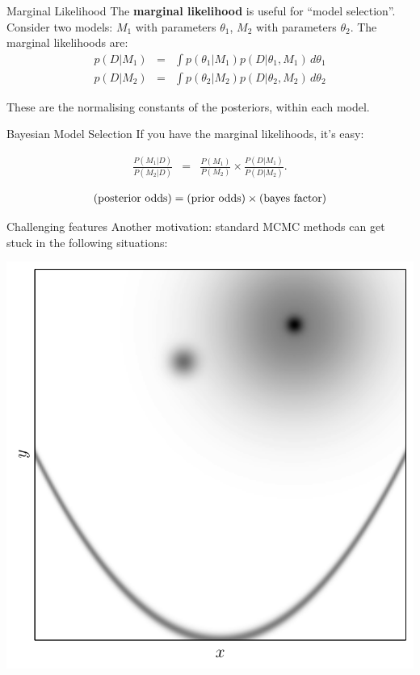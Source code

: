 \begin{frame}[t]{Marginal Likelihood}
The {\bf marginal likelihood} is useful for ``model selection''. Consider
two models: $M_1$ with parameters $\theta_1$, $M_2$ with parameters $\theta_2$.
The marginal likelihoods are:
\begin{eqnarray*}
p(D | M_1) &=& \int p(\theta_1 | M_1) p(D | \theta_1, M_1) \, d\theta_1\\
p(D | M_2) &=& \int p(\theta_2 | M_2) p(D | \theta_2, M_2) \, d\theta_2
\end{eqnarray*}

These are the normalising constants of the posteriors, within each model.
\end{frame}


\begin{frame}[t]{Bayesian Model Selection}
If you have the marginal likelihoods, it's easy:

\begin{eqnarray*}
\frac{P(M_1 | D)}{P(M_2 | D)} &=& \frac{P(M_1)}{P(M_2)}
\times \frac{P(D | M_1)}{P(D | M_2)}.
\end{eqnarray*}

\begin{eqnarray*}
\textnormal{(posterior odds)} = \textnormal{(prior odds)} \times \textnormal{(bayes factor)}
\end{eqnarray*}

\end{frame}


\begin{frame}[t]{Challenging features}
Another motivation: standard MCMC methods can get stuck in the following
situations:
\begin{center}
\includegraphics[scale=0.4]{challenges.pdf}
\end{center}
\end{frame}

